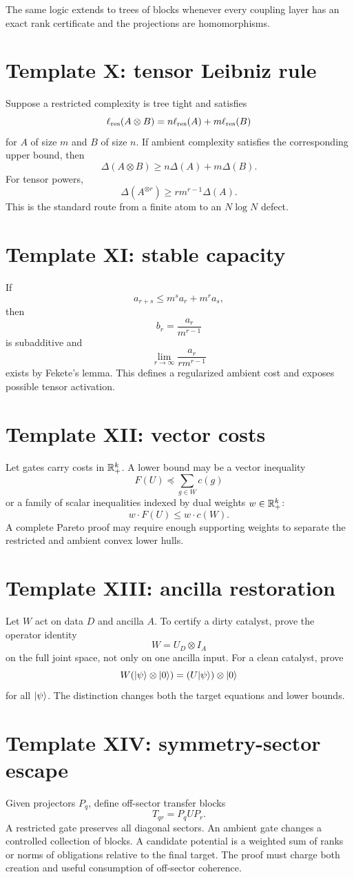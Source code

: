 The same logic extends to trees of blocks whenever every coupling layer has an exact rank certificate and the projections are homomorphisms.

\section{Template X: tensor Leibniz rule}
Suppose a restricted complexity is tree tight and satisfies
\[
\ell_{\mathrm{res}}(A\otimes B)
=n\ell_{\mathrm{res}}(A)+m\ell_{\mathrm{res}}(B)
\]
for $A$ of size $m$ and $B$ of size $n$.  If ambient complexity satisfies the corresponding upper bound, then
\[
\Delta(A\otimes B)
\ge
n\Delta(A)+m\Delta(B).
\]
For tensor powers,
\[
\Delta(A^{\otimes r})
\ge
r m^{r-1}\Delta(A).
\]
This is the standard route from a finite atom to an $N\log N$ defect.

\section{Template XI: stable capacity}
If
\[
a_{r+s}\le m^s a_r+m^r a_s,
\]
then
\[
b_r=\frac{a_r}{m^{r-1}}
\]
is subadditive and
\[
\lim_{r\to\infty}\frac{a_r}{r m^{r-1}}
\]
exists by Fekete's lemma.  This defines a regularized ambient cost and exposes possible tensor activation.

\section{Template XII: vector costs}
Let gates carry costs in $\mathbb R_+^k$.  A lower bound may be a vector inequality
\[
F(U)\preceq\sum_{g\in W}c(g)
\]
or a family of scalar inequalities indexed by dual weights $w\in\mathbb R_+^k$:
\[
w\cdot F(U)\le w\cdot c(W).
\]
A complete Pareto proof may require enough supporting weights to separate the restricted and ambient convex lower hulls.

\section{Template XIII: ancilla restoration}
Let $W$ act on data $D$ and ancilla $A$.  To certify a dirty catalyst, prove the operator identity
\[
W=U_D\otimes I_A
\]
on the full joint space, not only on one ancilla input.  For a clean catalyst, prove
\[
W(\lvert \psi\rangle\otimes\lvert 0\rangle)
=(U\lvert \psi\rangle)\otimes\lvert 0\rangle
\]
for all $\lvert \psi\rangle$.  The distinction changes both the target equations and lower bounds.

\section{Template XIV: symmetry-sector escape}
Given projectors $P_q$, define off-sector transfer blocks
\[
T_{qr}=P_qUP_r.
\]
A restricted gate preserves all diagonal sectors.  An ambient gate changes a controlled collection of blocks.  A candidate potential is a weighted sum of ranks or norms of obligations relative to the final target.  The proof must charge both creation and useful consumption of off-sector coherence.

